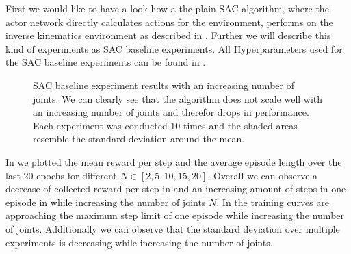 First we would like to have a look how a the plain SAC algorithm, where the actor network directly calculates actions for the environment, performs on the inverse kinematics environment as described in . Further we will describe this kind of experiments as SAC baseline experiments. All Hyperparameters used for the SAC baseline experiments can be found in .
\begin{figure}
    \begin{center}
        \hfill
    \end{center}
    \caption[SAC baseline experiment results]{SAC baseline experiment results with an increasing number of joints. We can clearly see that the algorithm does not scale well with an increasing number of joints and therefor drops in performance. Each experiment was conducted 10 times and the shaded areas resemble the standard deviation around the mean.}
    \label{fig:SAC_baseline}
\end{figure}

In  we plotted the mean reward per step and the average episode length over the last 20 epochs for different $N \in [2, 5, 10, 15, 20]$. Overall we can observe a decrease of collected reward per step in  and an increasing amount of steps in one episode in  while increasing the number of joints $N$. In  the training curves are approaching the maximum step limit of one episode while increasing the number of joints. Additionally we can observe that the standard deviation over multiple experiments is decreasing while increasing the number of joints.

